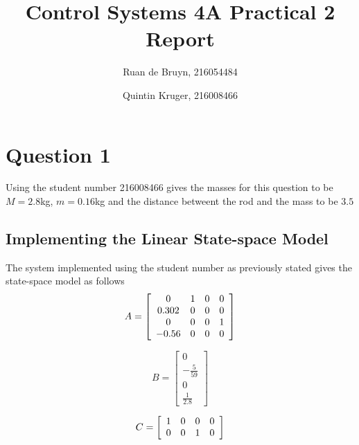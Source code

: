 \documentclass[a4paper, 12pt]{article}
\title{Control Systems 4A Practical 2 Report}
\author{Ruan de Bruyn, 216054484 \and Quintin Kruger, 216008466}
\begin{document}
\begin{titlepage}
  \maketitle
\end{titlepage}

\tableofcontents
\newpage
{}

\section{Question 1} %
\label{sec:question_1}
Using the student number 216008466 gives the masses for this question to be $M = 2.8$kg, $m = 0.16$kg and the distance betweent the rod and the mass to be $3.5$

\subsection{Implementing the Linear State-space Model} %
\label{sub:implementing_the_linear_state_space_model}
The system implemented  using the student number as previously stated gives the state-space model as follows 
\begin{equation}
  A = \left[
  \begin{array}{c c c c}
   	0 & 1 & 0 & 0 \\
   	0.302 &  0 & 0 & 0\\
   	0 & 0 & 0 & 1\\
   	-0.56 &  0 &  0 &  0\\
  \end{array}
  \right]
  \label{eq:a_q1}
\end{equation}

\begin{equation}
  B = \left[
  \begin{array}{c}
   0 \\-\frac{5}{59}\\ 0\\\frac{1}{2.8}
  \end{array}
  \right]
  \label{eq:b_q1}
\end{equation}

\begin{equation}
  C = \left[
  \begin{array}{c c c c}
    1 & 0 & 0 & 0\\
    0 & 0 & 1 & 0\\
  \end{array}
  \right]
  \label{eq:c_q1}
\end{equation}
\end{document}
